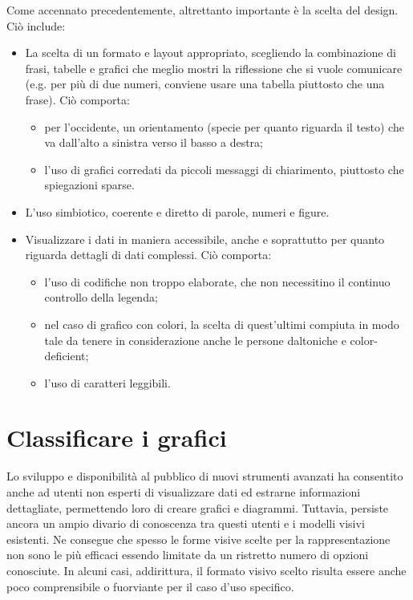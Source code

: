 \noindent Come accennato precedentemente, altrettanto importante è la scelta del design. Ciò include:
\begin{itemize}
    \item La scelta di un formato e layout appropriato, scegliendo la combinazione di frasi, tabelle
    e grafici che meglio mostri la riflessione che si vuole comunicare (e.g. per più di due numeri, conviene usare una tabella piuttosto che una frase). Ciò comporta:
    \begin{itemize}
        \item per l'occidente, un orientamento (specie per quanto riguarda il testo) che va dall'alto a sinistra verso il basso a destra;
        \item l'uso di grafici corredati da piccoli messaggi di chiarimento, piuttosto che spiegazioni sparse.
    \end{itemize}
    \item L'uso simbiotico, coerente e diretto di parole, numeri e figure.
    \item Visualizzare i dati in maniera accessibile, anche e soprattutto per quanto riguarda dettagli di dati complessi. Ciò comporta:
    \begin{itemize}
        \item l'uso di codifiche non troppo elaborate, che non necessitino il continuo controllo della legenda;
        \item nel caso di grafico con colori, la scelta di quest'ultimi compiuta in modo tale da tenere in considerazione anche le persone daltoniche e color-deficient;
        \item l'uso di caratteri leggibili.
    \end{itemize}
\end{itemize}



\section{Classificare i grafici}\label{sec:classificare_grafici}
Lo sviluppo e disponibilità al pubblico di nuovi strumenti avanzati ha consentito anche ad utenti non esperti di visualizzare dati ed estrarne informazioni dettagliate, 
permettendo loro di creare grafici e diagrammi.
Tuttavia, persiste ancora un ampio divario di conoscenza tra questi utenti e i modelli visivi esistenti.
Ne consegue che spesso le forme visive scelte per la rappresentazione non sono le più efficaci essendo limitate da un ristretto numero di opzioni conosciute.
In alcuni casi, addirittura, il formato visivo scelto risulta essere anche poco comprensibile o fuorviante per il caso d'uso specifico.

